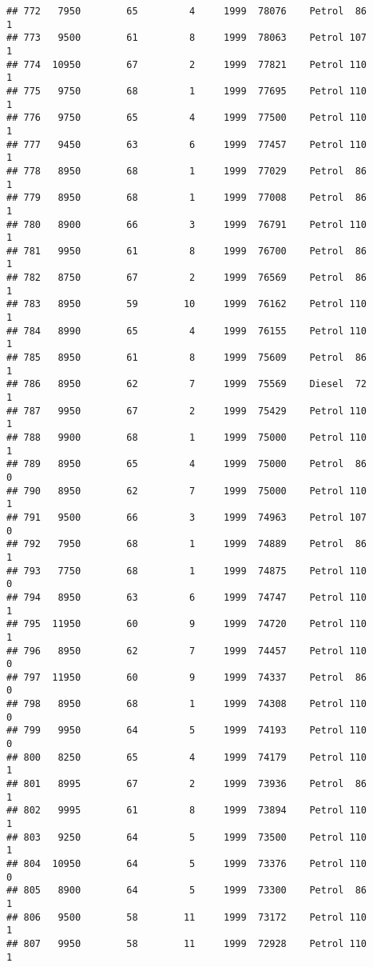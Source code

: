 \documentclass[]{article}
\begin{document}
\begin{verbatim}
## 772   7950        65         4     1999  78076    Petrol  86         1
## 773   9500        61         8     1999  78063    Petrol 107         1
## 774  10950        67         2     1999  77821    Petrol 110         1
## 775   9750        68         1     1999  77695    Petrol 110         1
## 776   9750        65         4     1999  77500    Petrol 110         1
## 777   9450        63         6     1999  77457    Petrol 110         1
## 778   8950        68         1     1999  77029    Petrol  86         1
## 779   8950        68         1     1999  77008    Petrol  86         1
## 780   8900        66         3     1999  76791    Petrol 110         1
## 781   9950        61         8     1999  76700    Petrol  86         1
## 782   8750        67         2     1999  76569    Petrol  86         1
## 783   8950        59        10     1999  76162    Petrol 110         1
## 784   8990        65         4     1999  76155    Petrol 110         1
## 785   8950        61         8     1999  75609    Petrol  86         1
## 786   8950        62         7     1999  75569    Diesel  72         1
## 787   9950        67         2     1999  75429    Petrol 110         1
## 788   9900        68         1     1999  75000    Petrol 110         1
## 789   8950        65         4     1999  75000    Petrol  86         0
## 790   8950        62         7     1999  75000    Petrol 110         1
## 791   9500        66         3     1999  74963    Petrol 107         0
## 792   7950        68         1     1999  74889    Petrol  86         1
## 793   7750        68         1     1999  74875    Petrol 110         0
## 794   8950        63         6     1999  74747    Petrol 110         1
## 795  11950        60         9     1999  74720    Petrol 110         1
## 796   8950        62         7     1999  74457    Petrol 110         0
## 797  11950        60         9     1999  74337    Petrol  86         0
## 798   8950        68         1     1999  74308    Petrol 110         0
## 799   9950        64         5     1999  74193    Petrol 110         0
## 800   8250        65         4     1999  74179    Petrol 110         1
## 801   8995        67         2     1999  73936    Petrol  86         1
## 802   9995        61         8     1999  73894    Petrol 110         1
## 803   9250        64         5     1999  73500    Petrol 110         1
## 804  10950        64         5     1999  73376    Petrol 110         0
## 805   8900        64         5     1999  73300    Petrol  86         1
## 806   9500        58        11     1999  73172    Petrol 110         1
## 807   9950        58        11     1999  72928    Petrol 110         1

\end{verbatim}
\end{document}
